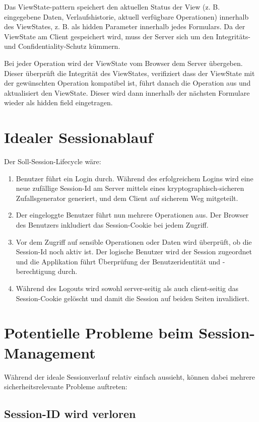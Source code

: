 Das ViewState-pattern speichert den aktuellen Status der View (z. B. eingegebene Daten, Verlaufshistorie, aktuell verfügbare Operationen) innerhalb des ViewStates, z. B. als hidden Parameter innerhalb jedes Formulars. Da der ViewState am Client gespeichert wird, muss der Server sich um den Integritäts- und Confidentiality-Schutz kümmern.

Bei jeder Operation wird der ViewState vom Browser dem Server übergeben. Dieser überprüft die Integrität des ViewStates, verifiziert dass der ViewState mit der gewünschten Operation kompatibel ist, führt danach die Operation aus und aktualisiert den ViewState. Dieser wird dann innerhalb der nächsten Formulare wieder als hidden field eingetragen.


\section{Idealer Sessionablauf}

Der Soll-Session-Lifecycle wäre:

\begin{enumerate}
	\item Benutzer führt ein Login durch. Während des erfolgreichem Logins wird eine neue zufällige Session-Id am Server mittels eines kryptographisch-sicheren Zufallsgenerator generiert, und dem Client auf sicherem Weg mitgeteilt.
	\item Der eingeloggte Benutzer führt nun mehrere Operationen aus. Der Browser des Benutzers inkludiert das Session-Cookie bei jedem Zugriff.
	\item Vor dem Zugriff auf sensible Operationen oder Daten wird überprüft, ob die Session-Id noch aktiv ist. Der logische Benutzer wird der Session zugeordnet und die Applikation führt Überprüfung der Benutzeridentität und -berechtigung durch.
	\item Während des Logouts wird sowohl server-seitig als auch client-seitig das Session-Cookie gelöscht und damit die Session auf beiden Seiten invalidiert.
\end{enumerate}

\section{Potentielle Probleme beim Session-Management}

Während der ideale Sessionverlauf relativ einfach aussieht, können dabei mehrere sicherheitsrelevante Probleme auftreten:

\subsection{Session-ID wird verloren}

